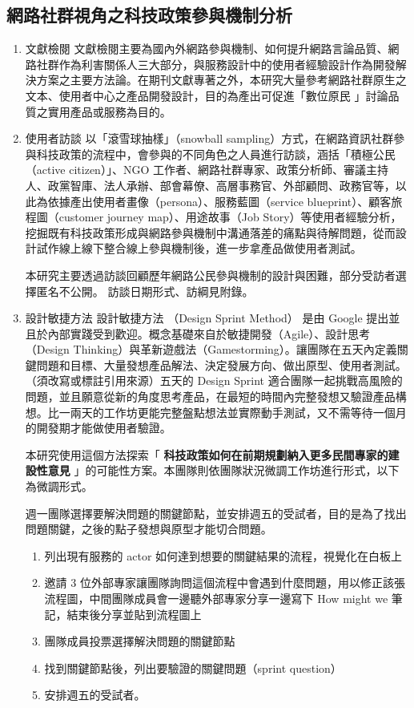 \documentclass[12pt,a4paper]{article}
\begin{document}
\subsection{網路社群視角之科技政策參與機制分析}
\label{sec:org4c6eac5}
\begin{enumerate}
\item 文獻檢閱
\label{sec:org688e25f}
文獻檢閱主要為國內外網路參與機制、如何提升網路言論品質、網路社群作為利害關係人三大部分，與服務設計中的使用者經驗設計作為開發解決方案之主要方法論。在期刊文獻專著之外，本研究大量參考網路社群原生之文本、使用者中心之產品開發設計，目的為產出可促進「數位原民 」討論品質之實用產品或服務為目的。
\item 使用者訪談
\label{sec:org207a54a}
以「滾雪球抽樣」（snowball sampling）方式，在網路資訊社群參與科技政策的流程中，會參與的不同角色之人員進行訪談，涵括「積極公民（active citizen）」、NGO 工作者、網路社群專家、政策分析師、審議主持人、政黨智庫、法人承辦、部會幕僚、高層事務官、外部顧問、政務官等，以此為依據產出使用者畫像（persona）、服務藍圖（service blueprint）、顧客旅程圖（customer journey map）、用途故事（Job Story）等使用者經驗分析，挖掘既有科技政策形成與網路參與機制中溝通落差的痛點與待解問題，從而設計試作線上線下整合線上參與機制後，進一步拿產品做使用者測試。

本研究主要透過訪談回顧歷年網路公民參與機制的設計與困難，部分受訪者選擇匿名不公開。 訪談日期形式、訪綱見附錄。
\item 設計敏捷方法
\label{sec:org081d66e}
設計敏捷方法 （Design Sprint Method）\cite{jake16} 是由 Google 提出並且於內部實踐受到歡迎。概念基礎來自於敏捷開發（Agile）、設計思考（Design Thinking）與革新遊戲法（Gamestorming）。讓團隊在五天內定義關鍵問題和目標、大量發想產品解法、決定發展方向、做出原型、使用者測試。（須改寫或標註引用來源）五天的 Design Sprint 適合團隊一起挑戰高風險的問題，並且願意從新的角度思考產品，在最短的時間內完整發想又驗證產品構想。比一兩天的工作坊更能完整盤點想法並實際動手測試，又不需等待一個月的開發期才能做使用者驗證。

本研究使用這個方法探索「 \textbf{科技政策如何在前期規劃納入更多民間專家的建設性意見} 」的可能性方案。本團隊則依團隊狀況微調工作坊進行形式，以下為微調形式。

週一團隊選擇要解決問題的關鍵節點，並安排週五的受試者，目的是為了找出問題關鍵，之後的點子發想與原型才能切合問題。
\begin{enumerate}
\item 列出現有服務的 actor 如何達到想要的關鍵結果的流程，視覺化在白板上
\item 邀請 3 位外部專家讓團隊詢問這個流程中會遇到什麼問題，用以修正該張流程圖，中間團隊成員會一邊聽外部專家分享一邊寫下 How might we 筆記，結束後分享並貼到流程圖上
\item 團隊成員投票選擇解決問題的關鍵節點
\item 找到關鍵節點後，列出要驗證的關鍵問題（sprint question）
\item 安排週五的受試者。
\end{enumerate}


\end{enumerate}
\end{document}
